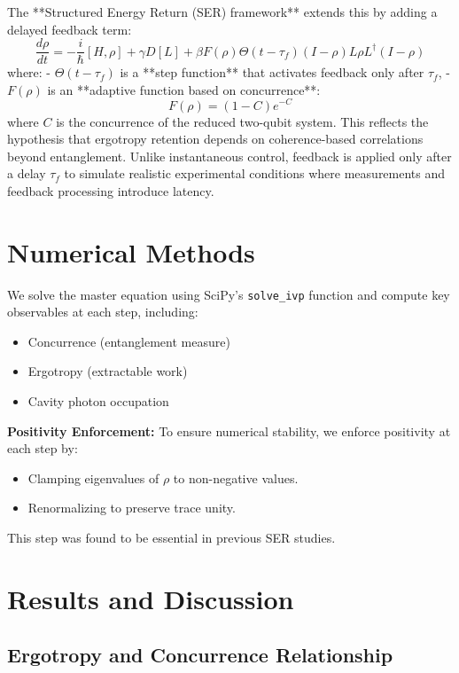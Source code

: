 \documentclass[a4paper,11pt]{article}
\begin{document}
The **Structured Energy Return (SER) framework** extends this by adding a delayed feedback term:
\begin{equation}
\frac{d\rho}{dt} = -\frac{i}{\hbar} [H, \rho] + \gamma D[L] + \beta F(\rho) \Theta(t - \tau_f) (I - \rho) L \rho L^{\dagger} (I - \rho)
\end{equation}
where:
- $\Theta(t - \tau_f)$ is a **step function** that activates feedback only after $\tau_f$,
- $F(\rho)$ is an **adaptive function based on concurrence**:
\begin{equation}
F(\rho) = (1 - C) e^{-C}
\end{equation}
where $C$ is the concurrence of the reduced two-qubit system. This reflects the hypothesis that ergotropy retention depends on coherence-based correlations beyond entanglement. Unlike instantaneous control, feedback is applied only after a delay $\tau_f$ to simulate realistic experimental conditions where measurements and feedback processing introduce latency.

\section{Numerical Methods}

We solve the master equation using SciPy’s \texttt{solve\_ivp} function and compute key observables at each step, including:
\begin{itemize}
    \item Concurrence (entanglement measure)
    \item Ergotropy (extractable work)
    \item Cavity photon occupation
\end{itemize}

\textbf{Positivity Enforcement:}
To ensure numerical stability, we enforce positivity at each step by:
\begin{itemize}
    \item Clamping eigenvalues of $\rho$ to non-negative values.
    \item Renormalizing to preserve trace unity.
\end{itemize}

This step was found to be essential in previous SER studies.


\section{Results and Discussion}

\subsection{Ergotropy and Concurrence Relationship}
\end{document}
